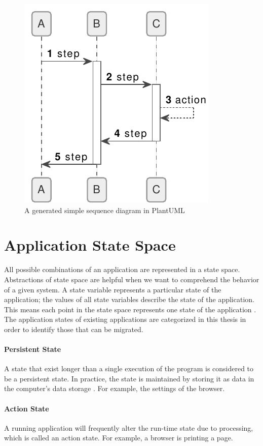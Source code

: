 \FloatBarrier
\begin{figure}[H]
    \includegraphics[scale=1]{../figures/example.pdf}
    \centering
    \caption{A generated simple sequence diagram in PlantUML}
    \label{fig:plantuml}
\end{figure}
\FloatBarrier

\section{Application State Space}
All possible combinations of an application are represented in a state space. Abstractions of state space are helpful when we want to comprehend the behavior of a given system. A state variable represents a particular state of the application; the values of all state variables describe the state of the application. This means each point in the state space represents one state of the application \cite{state-space}. The application states of existing applications are categorized in this thesis in order to identify those that can be migrated.

\paragraph{Persistent State}
A state that exist longer than a single execution of the program is considered to be a persistent state. In practice, the state is maintained by storing it as data in the computer's data storage \cite{pstate}. For example, the settings of the browser.


\paragraph{Action State}
A running application will frequently alter the run-time state due to processing, which is called an action state. For example, a browser is printing a page.

